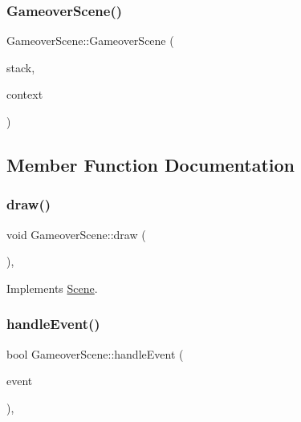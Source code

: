 \subsubsection{\texorpdfstring{Gameover\+Scene()}{GameoverScene()}}
{\footnotesize\ttfamily Gameover\+Scene\+::\+Gameover\+Scene (\begin{DoxyParamCaption}\item[{\hyperlink{class_scene_stack}{Scene\+Stack} \&}]{stack,  }\item[{\hyperlink{struct_scene_1_1_context}{Context}}]{context }\end{DoxyParamCaption})}



\subsection{Member Function Documentation}
\mbox{\label{class_gameover_scene_ae8a5e79e002d0e79edaec9ec1b0df902}} 
\subsubsection{\texorpdfstring{draw()}{draw()}}
{\footnotesize\ttfamily void Gameover\+Scene\+::draw (\begin{DoxyParamCaption}{ }\end{DoxyParamCaption})\hspace{0.3cm}{\ttfamily [override]}, {\ttfamily [virtual]}}



Implements \hyperlink{class_scene_a789c16961aa1e316b2a4a05b95187546}{Scene}.

\mbox{\label{class_gameover_scene_ac951bc51d29e2d14807e3da2e885ccc8}} 
\subsubsection{\texorpdfstring{handle\+Event()}{handleEvent()}}
{\footnotesize\ttfamily bool Gameover\+Scene\+::handle\+Event (\begin{DoxyParamCaption}\item[{const sf\+::\+Event \&}]{event }\end{DoxyParamCaption})\hspace{0.3cm}{\ttfamily [override]}, {\ttfamily [virtual]}}



